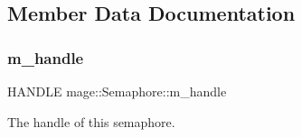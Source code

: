 \subsection{Member Data Documentation}
\hypertarget{structmage_1_1_semaphore_ac1ded856984b4ac3739d9ff627838fda}{}\label{structmage_1_1_semaphore_ac1ded856984b4ac3739d9ff627838fda} 
\subsubsection{\texorpdfstring{m\+\_\+handle}{m\_handle}}
{\footnotesize\ttfamily H\+A\+N\+D\+LE mage\+::\+Semaphore\+::m\+\_\+handle\hspace{0.3cm}{\ttfamily [private]}}

The handle of this semaphore. 